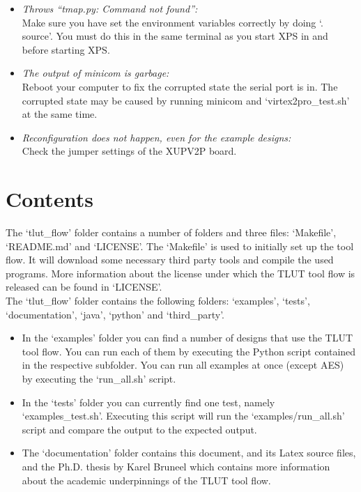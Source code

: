 \documentclass[a4paper,oneside]{memoir}
\begin{document}
\begin{itemize}
\item \emph{Throws ``tmap.py: Command not found'':}\\
Make sure you have set the environment variables correctly by doing `. source'. You must do this in the same terminal as you start XPS in and before starting XPS.
\item \emph{The output of minicom is garbage:}\\
Reboot your computer to fix the corrupted state the serial port is in. The corrupted state may be caused by running minicom and `virtex2pro\_test.sh' at the same time.
\item \emph{Reconfiguration does not happen, even for the example designs:}\\
Check the jumper settings of the XUPV2P board.
\end{itemize}



\clearpage
\chapter{Contents}\label{sec:contents}
The `tlut\_flow' folder contains a number of folders and three files: `Makefile', `README.md' and `LICENSE'. 
The `Makefile' is used to initially set up the tool flow. It will download  some necessary third party tools and compile the used programs.
More information about the license under which the TLUT tool flow is released can be found in `LICENSE'.\\

The `tlut\_flow' folder contains the following folders:  `examples', `tests', `documentation',  `java', `python' and `third\_party'.

\begin{itemize}
\item In the `examples' folder you can find a number of designs that use the TLUT tool flow. You can run each of them by executing the Python script contained in the respective subfolder. You can run all examples at once (except AES) by executing the `run\_all.sh' script.
\item In the `tests' folder you can currently find one test, namely `examples\_test.sh'. Executing this script will run the `examples/run\_all.sh' script and compare the output to the expected output.
\item The `documentation' folder contains this document, and its Latex source files, and the Ph.D. thesis by Karel Bruneel which contains more information about the academic underpinnings of the TLUT tool flow.
\end{itemize}
\end{document}
